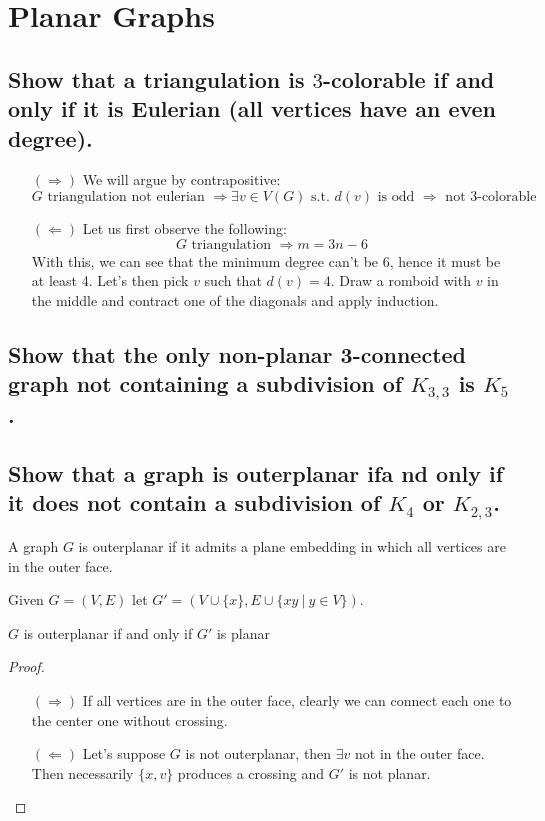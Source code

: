 \section{Planar Graphs}

\subsection[Planar Graphs 2]{Show that a triangulation is $3$-colorable if and only if it is Eulerian (all vertices have an even degree).}

\begin{itemize}
    \item[$(\Rightarrow)$] We will argue by contrapositive:
        $$ G \text{ triangulation not eulerian } \Rightarrow \exists v \in V(G) \text{ s.t. } d(v) \text{ is odd } \Rightarrow \text{ not 3-colorable }$$
    \item[$(\Leftarrow)$] Let us first observe the following:
        $$ G \text{ triangulation } \Rightarrow m = 3n -6$$
        With this, we can see that the minimum degree can't be 6, hence it must be at least 4.
        Let's then pick $v$ such that $d(v) = 4$.
        Draw a romboid with $v$ in the middle and contract one of the diagonals and apply induction.
\end{itemize}


\subsection[Planar Graphs 10]{Show that the only non-planar 3-connected graph not containing a subdivision of $K_{3,3}$ is $K_5$.}

\subsection[Planar Graphs 11]{Show that a graph is outerplanar ifa nd only if it does not contain a subdivision of $K_4$ or $K_{2,3}$.}

\begin{definition}
    A graph $G$ is outerplanar if it admits a plane embedding in which all vertices are in the outer face.
\end{definition}

Given $G = (V, E)$ let $G' = (V \cup \{ x\}, E \cup \{ xy \: | \: y \in V \})$.

\begin{claim}
    $G$ is outerplanar if and only if $G'$ is planar
\end{claim}
\begin{proof}
    \begin{itemize}
        \item[$(\Rightarrow)$] If all vertices are in the outer face, clearly we can connect each one to the center one without crossing.
        \item[$(\Leftarrow)$] Let's suppose $G$ is not outerplanar, then $\exists v$ not in the outer face.
            Then necessarily $\{x , v\}$ produces a crossing and $G'$ is not planar.
    \end{itemize}
\end{proof}

